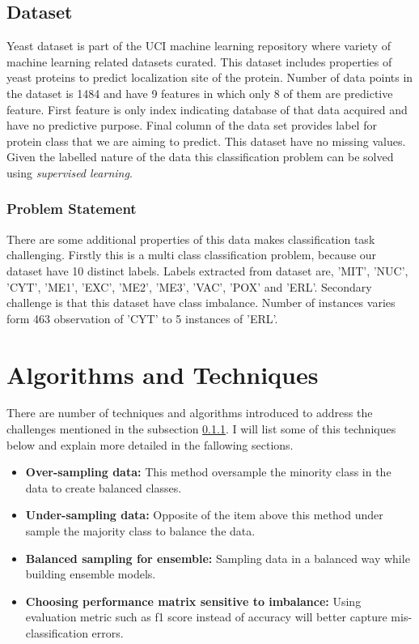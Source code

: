 \documentclass[12pt]{article}
\begin{document}
\subsection{Dataset} \label{subsec:data}

Yeast dataset is part of the UCI machine learning repository where variety of machine learning related datasets curated. This dataset includes properties of yeast proteins to predict localization site of the protein. Number of data points in the dataset is 1484 and have 9 features in which only 8 of them are predictive feature. First feature is only index indicating database of that data acquired and have no predictive purpose. Final column of the data set provides label for protein class that we are aiming to predict. This dataset have no missing values. Given the labelled nature of the data this classification problem can be solved using \textit{supervised learning}.

\subsubsection{Problem Statement} \label{subsec:problem}

There are some additional properties of this data makes classification task challenging. Firstly this is a multi class classification problem, because our dataset have 10 distinct labels. Labels extracted from dataset are, 'MIT', 'NUC', 'CYT', 'ME1', 'EXC', 'ME2', 'ME3', 'VAC', 'POX' and 'ERL'. Secondary challenge is that this dataset have class imbalance. Number of instances varies form 463 observation of 'CYT' to 5 instances of 'ERL'.

\section{Algorithms and Techniques} \label{sec:algo}

There are number of techniques and algorithms introduced to address the challenges mentioned in the subsection \ref{subsec:problem}. I will list some of this techniques below and explain more detailed in the fallowing sections.

\begin{itemize}
    \item \textbf{Over-sampling data: }This method oversample the minority class in the data to create balanced classes.
    \item \textbf{Under-sampling data: }Opposite of the item above this method under sample the majority class to balance the data.
    \item \textbf{Balanced sampling for ensemble: }Sampling data in a balanced way while building ensemble models.
    \item \textbf{Choosing performance matrix sensitive to imbalance: }Using evaluation metric such as f1 score instead of accuracy will better capture mis-classification errors.
\end{itemize}
\end{document}
